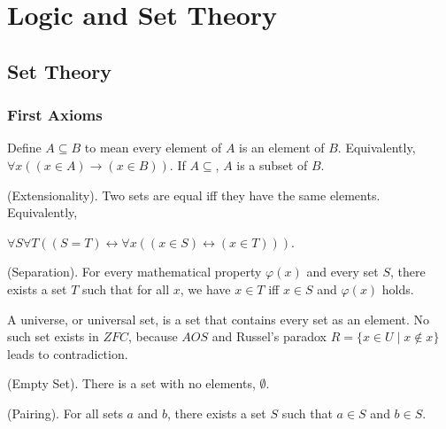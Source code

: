 \documentclass{report}
\begin{document}
\part{Logic and Set Theory}
\chapter{Set Theory}
\section{First Axioms} 


\begin{definition}
  Define $A \subseteq B$ to mean every element of $A$ is an element of $B$. Equivalently, $\forall x\left( \left( x \in A \right) \rightarrow \left( x \in B \right) \right)$. If $A \subseteq$, $A$ is a subset of $B$.
\end{definition}

\begin{axiom}
  {\normalfont (Extensionality).} Two sets are equal iff they have the same elements. Equivalently, 
  
 \noindent $\forall S \forall T \left( \left( S = T \right) \leftrightarrow \forall x \left( \left( x \in S \right) \leftrightarrow \left( x \in T \right) \right) \right)$.
\end{axiom}

\begin{axiom}
  {\normalfont (Separation).} For every mathematical property $\varphi(x)$ and every set $S$, there exists a set $T$ such that for all $x$, we have $x \in T$ iff $x \in S$ and $\varphi(x)$ holds.
\end{axiom}

\begin{definition}
  A universe, or universal set, is a set that contains every set as an element. No such set exists in $ZFC$, because $AOS$ and Russel's paradox $R = \{ x \in U \mid x \notin x\}$ leads to contradiction.
\end{definition}

\begin{axiom}
  {\normalfont (Empty Set).} There is a set with no elements, $\emptyset$.
\end{axiom}

\begin{axiom}
  {\normalfont (Pairing).} For all sets $a$ and $b$, there exists a set $S$ such that $a \in S$ and $b \in S$.
\end{axiom}
\end{document}
